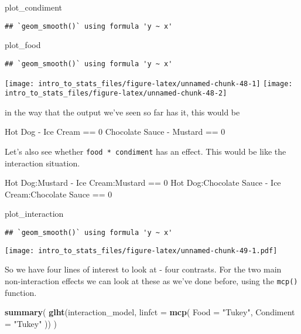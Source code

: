 \documentclass[]{book}
\newenvironment{Shaded}{\begin{snugshade}}{\end{snugshade}}
\newcommand{\DataTypeTok}[1]{\textcolor[rgb]{0.13,0.29,0.53}{#1}}
\newcommand{\KeywordTok}[1]{\textcolor[rgb]{0.13,0.29,0.53}{\textbf{#1}}}
\newcommand{\NormalTok}[1]{#1}
\newcommand{\StringTok}[1]{\textcolor[rgb]{0.31,0.60,0.02}{#1}}
\begin{document}
\begin{Shaded}
\begin{Highlighting}[]
\NormalTok{plot_condiment}
\end{Highlighting}
\end{Shaded}

\begin{verbatim}
## `geom_smooth()` using formula 'y ~ x'
\end{verbatim}

\begin{Shaded}
\begin{Highlighting}[]
\NormalTok{plot_food}
\end{Highlighting}
\end{Shaded}

\begin{verbatim}
## `geom_smooth()` using formula 'y ~ x'
\end{verbatim}

\texttt{[image: intro\_to\_stats\_files/figure-latex/unnamed-chunk-48-1]} \texttt{[image: intro\_to\_stats\_files/figure-latex/unnamed-chunk-48-2]}

in the way that the output we've seen so far has it, this would be

Hot Dog - Ice Cream == 0
Chocolate Sauce - Mustard == 0

Let's also see whether \texttt{food\ *\ condiment} has an effect. This would be like the interaction situation.

Hot Dog:Mustard - Ice Cream:Mustard == 0
Hot Dog:Chocolate Sauce - Ice Cream:Chocolate Sauce == 0

\begin{Shaded}
\begin{Highlighting}[]
\NormalTok{plot_interaction}
\end{Highlighting}
\end{Shaded}

\begin{verbatim}
## `geom_smooth()` using formula 'y ~ x'
\end{verbatim}

\texttt{[image: intro\_to\_stats\_files/figure-latex/unnamed-chunk-49-1.pdf]}

So we have four lines of interest to look at - four contrasts. For the two main non-interaction effects we can look at these as we've done before, using the \texttt{mcp()} function.

\begin{Shaded}
\begin{Highlighting}[]
\KeywordTok{summary}\NormalTok{(}
  \KeywordTok{glht}\NormalTok{(interaction_model, }\DataTypeTok{linfct =} \KeywordTok{mcp}\NormalTok{(}
    \DataTypeTok{Food =} \StringTok{"Tukey"}\NormalTok{,}
    \DataTypeTok{Condiment =} \StringTok{"Tukey"}
\NormalTok{  ))}
\NormalTok{)}
\end{Highlighting}
\end{Shaded}
\end{document}
